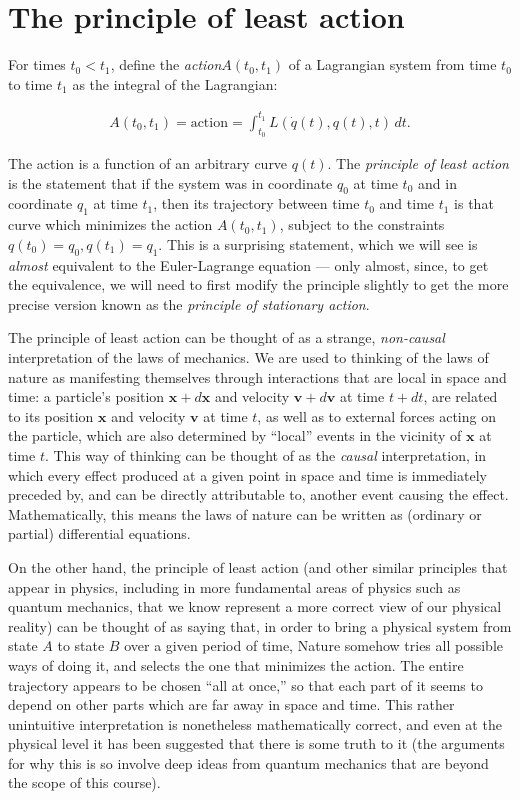 \documentclass[11pt]{report}
\theoremstyle{plain}
\theoremstyle{definition}
\begin{document}
\section{The principle of least action}

For times $t_0<t_1$, define the \emph{action}$A(t_0,t_1)$
of a Lagrangian system from time $t_0$ to time $t_1$
as the integral of the Lagrangian:

\begin{align*}
A(t_0,t_1)=\textrm{action} = \int_{t_0}^{t_1} L(\dot{q}(t),q(t),t)\,dt.
\end{align*}

\noindent The action is a function of an arbitrary curve $q(t)$.
The \emph{principle of least action} is the statement that
if the system was in coordinate $q_0$ at time $t_0$
and in coordinate $q_1$ at time $t_1$, then its
trajectory between time $t_0$ and time $t_1$ is that
curve which minimizes the action $A(t_0,t_1)$, subject
to the constraints $q(t_0)=q_0, q(t_1)=q_1$. This is a
surprising statement, which we will see is \emph{almost}
equivalent to the Euler-Lagrange equation --- only
almost, since, to get the equivalence, we will need to
first modify the principle slightly to get the more
precise version known as the \emph{principle of stationary
action}.

The principle of least action can be thought of as a
strange, \emph{non-causal} interpretation of the laws of
mechanics. We are used to thinking of the laws of
nature as manifesting themselves through interactions
that are local in space and time: a particle's
position $\mathbf{x}+d\mathbf{x}$ and velocity
$\mathbf{v}+d\mathbf{v}$ at time $t+dt$, are related
to its position $\mathbf{x}$ and velocity $\mathbf{v}$
at time $t$, as well as to external forces acting on
the particle, which are also determined by ``local''
events in the vicinity of $\mathbf{x}$ at time $t$.
This way of thinking can be thought of as the \emph{causal}
interpretation, in which every effect produced at a
given point in space and time is immediately preceded
by, and can be directly attributable to, another event
causing the effect. Mathematically, this means the
laws of nature can be written as (ordinary or partial)
differential equations.

On the other hand, the principle of least action (and
other similar principles that appear in physics,
including in more fundamental areas of physics such as
quantum mechanics, that we know represent a more
correct view of our physical reality) can be thought
of as saying that, in order to bring a physical system
from state $A$ to state $B$ over a given period of
time, Nature somehow tries all possible ways of doing
it, and selects the one that minimizes the action. The
entire trajectory appears to be chosen ``all at
once,'' so that each part of it seems to depend on
other parts which are far away in space and time. This
rather unintuitive interpretation is nonetheless
mathematically correct, and even at the physical level
it has been suggested that there is some truth to it
(the arguments for why this is so involve deep ideas
from quantum mechanics that are beyond the scope of
this course).
\end{document}
